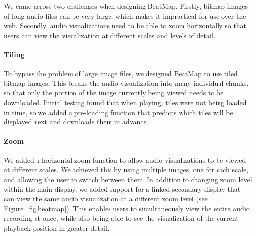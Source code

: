 We came across two challenges when designing BeatMap. Firstly, bitmap images of long audio files can be very large,
which makes it impractical for use over the web. Secondly, audio visualizations need to be able to zoom horizontally so
that users can view the visualization at different scales and levels of detail.

\paragraph{Tiling}
To bypass the problem of large image files, we designed BeatMap to use tiled bitmap images. This breaks the audio
visualization into many individual chunks, so that only the portion of the image currently being viewed needs to be
downloaded. Initial testing found that when playing, tiles were not being loaded in time, so we added a pre-loading
function that predicts which tiles will be displayed next and downloads them in advance.

\paragraph{Zoom}
We added a horizontal zoom function to allow audio visualizations to be viewed at different scales. We achieved this by
using multiple images, one for each scale, and allowing the user to switch between them. In addition to changing zoom
level within the main display, we added support for a linked secondary display that can view the same audio
visualization at a different zoom level (see Figure~\ref{fig:beatmap}). This enables users to simultaneously view the
entire audio recording at once, while also being able to see the visualization of the current playback position in
greater detail.

